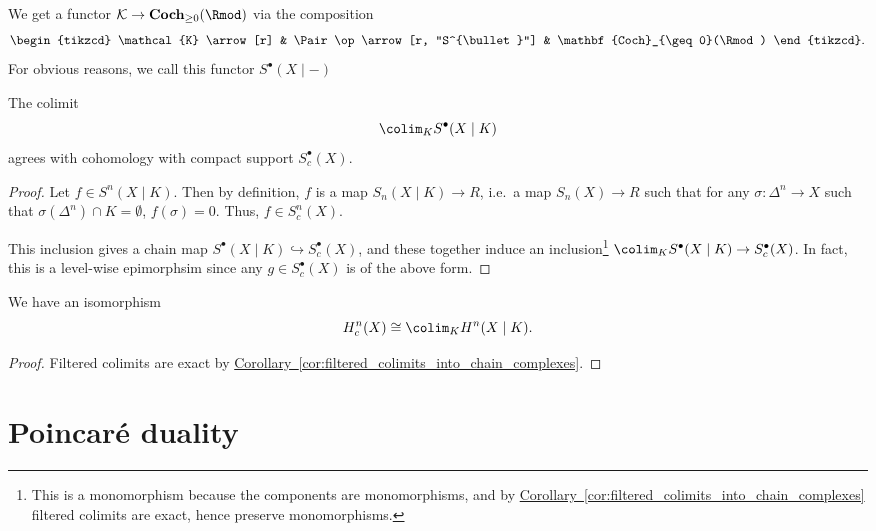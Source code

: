 \documentclass[main.tex]{subfiles}
\begin{document}
We get a functor \(\mathcal{K} \to \mathbf{Coch}_{\geq 0}(\Rmod)\) via the composition
\begin{equation*}
  \begin{tikzcd}
    \mathcal{K}
    \arrow[r]
    & \Pair\op
    \arrow[r, "S^{\bullet}"]
    & \mathbf{Coch}_{\geq 0}(\Rmod)
  \end{tikzcd}.
\end{equation*}
For obvious reasons, we call this functor \(S^{\bullet}(X \mid -)\)

\begin{proposition}
  The colimit
  \begin{equation*}
    \colim_{K} S^{\bullet}(X \mid K)
  \end{equation*}
  agrees with cohomology with compact support \(S^{\bullet}_{c}(X)\).
\end{proposition}
\begin{proof}
  Let \(f \in S^{n}(X \mid K)\). Then by definition, \(f\) is a map \(S_{n}(X \mid K) \to R\), i.e.\ a map \(S_{n}(X) \to R\) such that for any \(\sigma\colon \Delta^{n} \to X\) such that \(\sigma(\Delta^{n}) \cap K = \emptyset\), \(f(\sigma) = 0\). Thus, \(f \in S^{n}_{c}(X)\).

  This inclusion gives a chain map \(S^{\bullet}(X \mid K) \hookrightarrow S^{\bullet}_{c}(X)\), and these together induce an inclusion\footnote{This is a monomorphism because the components are monomorphisms, and by \hyperref[cor:filtered_colimits_into_chain_complexes]{Corollary~\ref*{cor:filtered_colimits_into_chain_complexes}} filtered colimits are exact, hence preserve monomorphisms.} \(\colim_{K} S^{\bullet}(X \mid K) \to S^{\bullet}_{c}(X)\). In fact, this is a level-wise epimorphsim since any \(g \in S^{\bullet}_{c}(X)\) is of the above form.
\end{proof}

\begin{corollary}
  We have an isomorphism
  \begin{equation*}
    H^{n}_{c}(X) \cong \colim_{K} H^{n}(X \mid K).
  \end{equation*}
\end{corollary}
\begin{proof}
  Filtered colimits are exact by \hyperref[cor:filtered_colimits_into_chain_complexes]{Corollary~\ref*{cor:filtered_colimits_into_chain_complexes}}.
\end{proof}

\section{Poincaré duality}
\label{sec:poincare_duality}
\end{document}

